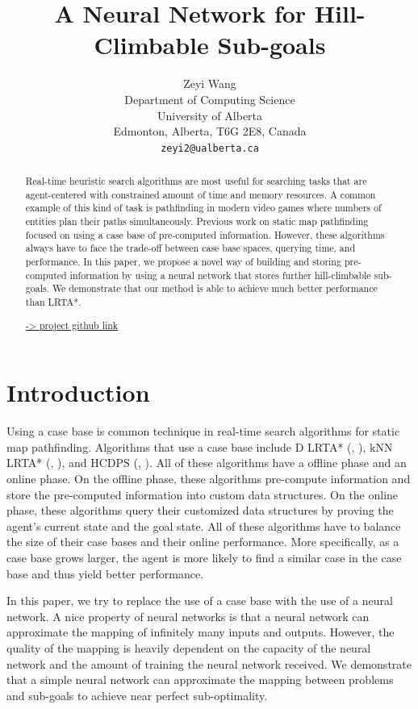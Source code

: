 \documentclass[letterpaper]{article}
\title{A Neural Network for Hill-Climbable Sub-goals}
\author{Zeyi Wang \\
    Department of Computing Science \\ University of Alberta \\
    Edmonton, Alberta, T6G 2E8, Canada \\
    {\texttt{zeyi2@ualberta.ca} }}
\newcommand{\citea}[1]{(\citeauthor{#1}, \citeyear{#1})}
\numberwithin{equation}{section}
\numberwithin{theorem}{section}
\numberwithin{lemma}{section}
\numberwithin{df}{section}
\begin{document}
    \maketitle

    \begin{abstract}
        Real-time heuristic search algorithms are most useful for searching tasks that are agent-centered with constrained amount of time and memory resources.
        A common example of this kind of task is pathfinding in modern video games where numbers of entities plan their paths simultaneously.
        Previous work on static map pathfinding focused on using a case base of pre-computed information.
        However, these algorithms always have to face the trade-off between case base spaces, querying time, and performance.
        In this paper, we propose a novel way of building and storing pre-computed information by using a neural network that stores further hill-climbable sub-goals.
        We demonstrate that our method is able to achieve much better performance than LRTA*.

        \href{https://github.com/uduse/neural-network-for-hill-climbling-subgoals}{-> project github link}

    \end{abstract}


    \section{Introduction}\label{sec:introduction}
    Using a case base is common technique in real-time search algorithms for static map pathfinding.
    Algorithms that use a case base include D LRTA* \citea{dlrta}, kNN LRTA* \citea{knnlrta}, and HCDPS \citea{hcdps}.
    All of these algorithms have a offline phase and an online phase.
    On the offline phase, these algorithms pre-compute information and store the pre-computed information into custom data structures.
    On the online phase, these algorithms query their customized data structures by proving the agent's current state and the goal state.
    All of these algorithms have to balance the size of their case bases and their online performance.
    More specifically, as a case base grows larger, the agent is more likely to find a similar case in the case base and thus yield better performance.

    In this paper, we try to replace the use of a case base with the use of a neural network.
    A nice property of neural networks is that a neural network can approximate the mapping of infinitely many inputs and outputs.
    However, the quality of the mapping is heavily dependent on the capacity of the neural network and the amount of training the neural network received.
    We demonstrate that a simple neural network can approximate the mapping between problems and sub-goals to achieve near perfect sub-optimality.
\end{document}
